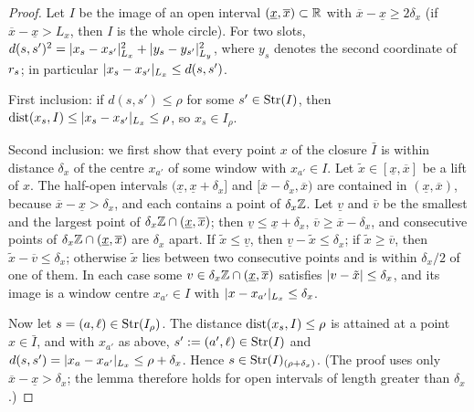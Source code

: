 \begin{proof}
Let $I$ be the image of an open interval $(\underline x,\overline x)\subset\mathbb{R}$ with $\overline x-\underline x\ge2\delta_x$ (if
$\overline x-\underline x>L_x$, then $I$ is the whole circle). For two slots,
$d(s,s')^2=\lvert x_s-x_{s'}\rvert_{L_x}^2+\lvert y_s-y_{s'}\rvert_{L_y}^2$, where $y_s$ denotes the second coordinate of $r_{s}$; in
particular $\lvert x_s-x_{s'}\rvert_{L_x}\le d(s,s')$.

First inclusion: if $d(s,s')\le\rho$ for some $s'\in\mathrm{Str}(I)$, then $\operatorname{dist}(x_s,I)\le\lvert x_s-x_{s'}\rvert_{L_x}\le\rho$, so
$x_s\in I_\rho$.

Second inclusion: we first show that every point $x$ of the closure $\bar I$ is within distance $\delta_x$ of the
centre $x_{a'}$ of some window with $x_{a'}\in I$. Let $\tilde x\in[\underline x,\overline x]$ be a lift of $x$. The
half-open intervals $(\underline x,\underline x+\delta_x]$ and $[\overline x-\delta_x,\overline x)$ are contained in
$(\underline x,\overline x)$, because $\overline x-\underline x>\delta_x$, and each contains a point of $\delta_x\mathbb{Z}$. Let
$\underline v$ and $\overline v$ be the smallest and the largest point of $\delta_x\mathbb{Z}\cap(\underline x,\overline x)$; then
$\underline v\le\underline x+\delta_x$, $\overline v\ge\overline x-\delta_x$, and consecutive points of
$\delta_x\mathbb{Z}\cap(\underline x,\overline x)$ are $\delta_x$ apart. If $\tilde x\le\underline v$, then $\underline v-\tilde x\le\delta_x$;
if $\tilde x\ge\overline v$, then $\tilde x-\overline v\le\delta_x$; otherwise $\tilde x$ lies between two consecutive points
and is within $\delta_x/2$ of one of them. In each case some $v\in\delta_x\mathbb{Z}\cap(\underline x,\overline x)$ satisfies
$\lvert v-\tilde x\rvert\le\delta_x$, and its image is a window centre $x_{a'}\in I$ with $\lvert x-x_{a'}\rvert_{L_x}\le\delta_x$.

Now let $s=(a,\ell)\in\mathrm{Str}(I_\rho)$. The distance $\operatorname{dist}(x_s,I)\le\rho$ is attained at a point $x\in\bar I$, and with
$x_{a'}$ as above, $s':=(a',\ell)\in\mathrm{Str}(I)$ and $d(s,s')=\lvert x_a-x_{a'}\rvert_{L_x}\le\rho+\delta_x$. Hence
$s\in\mathrm{Str}(I)_{(\rho+\delta_x)}$. (The proof uses only $\overline x-\underline x>\delta_x$; the lemma therefore holds for open
intervals of length greater than $\delta_x$.)
\end{proof}

